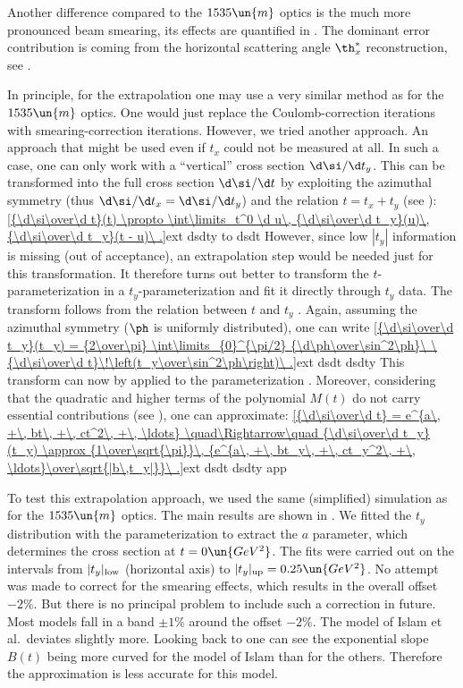 Another difference compared to the $1535\un{m}$ optics is the much more pronounced beam smearing, its effects are quantified in . The dominant error contribution is coming from the horizontal scattering angle $\th_x^*$ reconstruction, see .

In principle, for the extrapolation one may use a very similar method as for the $1535\un{m}$ optics. One would just replace the Coulomb-correction iterations with smearing-correction iterations. However, we tried another approach. An approach that might be used even if $t_x$ could not be measured at all. In such a case, one can only work with a ``vertical'' cross section $\d\si/\d t_y$. This can be transformed into the full cross section $\d\si/\d t$ by exploiting the azimuthal symmetry (thus $\d\si/\d t_x = \d\si/\d t_y$) and the relation $t = t_x + t_y$ (see ):
\eqref{{\d\si\over\d t}(t) \propto \int\limits_t^0 \d u\, {\d\si\over\d t_y}(u)\, {\d\si\over\d t_y}(t - u)\ .}{ext dsdty to dsdt}
However, since low $|t_y|$ information is missing (out of acceptance), an extrapolation step would be needed just for this transformation. It therefore turns out better to transform the $t$-parameterization  in a $t_y$-parameterization and fit it directly through $t_y$ data. The transform follows from the relation between $t$ and $t_y$ . Again, assuming the azimuthal symmetry ($\ph$ is uniformly distributed), one can write
\eqref{{\d\si\over\d t_y}(t_y) = {2\over\pi} \int\limits_{0}^{\pi/2} {\d\ph\over\sin^2\ph}\ \ {\d\si\over\d t}\!\left(t_y\over\sin^2\ph\right)\ .}{ext dsdt dsdty}
This transform can now by applied to the parameterization . Moreover, considering that the quadratic and higher terms of the polynomial $M(t)$ do not carry essential contributions (see ), one can approximate:
\eqref{{\d\si\over\d t} = e^{a\, +\, bt\, +\, ct^2\, +\, \ldots} \quad\Rightarrow\quad {\d\si\over\d t_y}(t_y) \approx {1\over\sqrt{\pi}}\, {e^{a\, +\, bt_y\, +\, ct_y^2\, +\, \ldots}\over\sqrt{|b\,t_y|}}\ .}{ext dsdt dsdty app}

To test this extrapolation approach, we used the same (simplified)  simulation as for the $1535\un{m}$ optics. The main results are shown in . We fitted the $t_y$ distribution with the parameterization  to extract the $a$ parameter, which determines the cross section at $t=0\un{GeV^2}$. The fits were carried out on the intervals from $|t_y|_{\rm low}$ (horizontal axis) to $|t_y|_{\rm up} = 0.25\un{GeV^2}$. No attempt was made to correct for the smearing effects, which results in the overall offset $-2\percent$. But there is no principal problem to include such a correction in future. Most models fall in a band $\pm 1\percent$ around the offset $-2\percent$. The model of Islam et al.~deviates slightly more. Looking back to  one can see the exponential slope $B(t)$ being more curved for the model of Islam than for the others. Therefore the approximation  is less accurate for this model.

